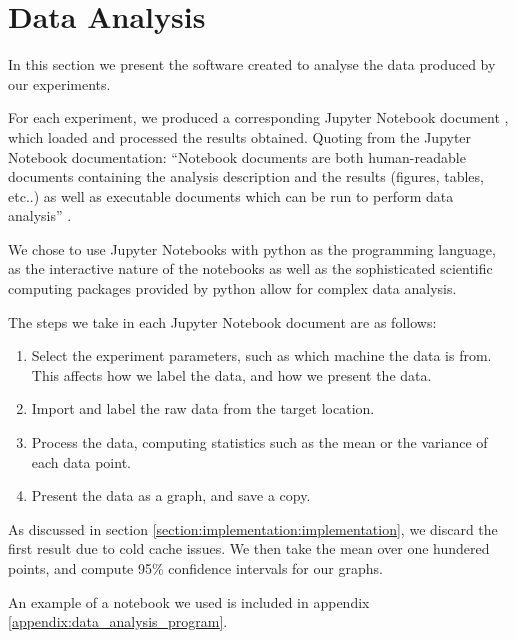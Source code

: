 \section{Data Analysis}
\label{section:experimental_methodology:data_analysis}

In this section we present the software created to analyse the data produced by our experiments.

For each experiment, we produced a corresponding Jupyter Notebook document \cite{project_jupyter}, which loaded and processed the results obtained. Quoting from the Jupyter Notebook documentation: ``Notebook documents are both human-readable documents containing the analysis description and the results (figures, tables, etc..) as well as executable documents which can be run to perform data analysis'' \cite{what_is_jupyter_notebook}.

We chose to use Jupyter Notebooks with python as the programming language, as the interactive nature of the notebooks as well as the sophisticated scientific computing packages provided by python allow for complex data analysis.

The steps we take in each Jupyter Notebook document are as follows:

\begin{enumerate}
    \item Select the experiment parameters, such as which machine the data is from. This affects how we label the data, and how we present the data.
    \item Import and label the raw data from the target location.
    \item Process the data, computing statistics such as the mean or the variance of each data point.
    \item Present the data as a graph, and save a copy.
\end{enumerate}

As discussed in section \ref{section:implementation:implementation}, we discard the first result due to cold cache issues. We then take the mean over one hundered points, and compute 95\% confidence intervals for our graphs.

An example of a notebook we used is included in appendix \ref{appendix:data_analysis_program}.